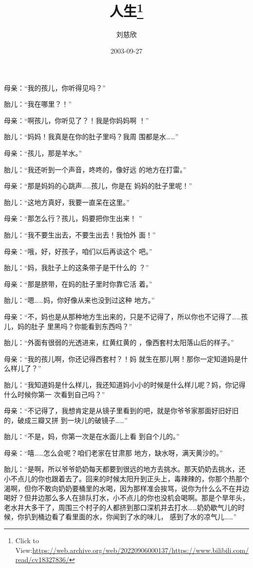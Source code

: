 \documentclass{article}
\title{人生\footnote{Click to View:\url{https://web.archive.org/web/20220906000137/https://www.bilibili.com/read/cv18327836/}}}
\author{刘慈欣}
\date{2003-09-27}
\begin{document}

\maketitle


\Large


﻿母亲：“我的孩儿，你听得见吗？” 


胎儿：“我在哪里？！” 

母亲：“啊孩儿，你听见了？！我是你妈妈啊
！” 

胎儿：“妈妈！我真是在你的肚子里吗？我周
围都是水……” 


母亲：“孩儿，那是羊水。” 

胎儿：“我还听到一个声音，咚咚的，像好远
的地方在打雷。” 

\newpage

母亲：“那是妈妈的心跳声……孩儿，你是在
妈妈的肚子里呢！” 

胎儿：“这地方真好，我要一直呆在这里。”
 

母亲：“那怎么行？孩儿，妈要把你生出来！
” 

胎儿：“我不要生出去，不要生出去！我怕外
面！” 

母亲：“哦，好，好孩子，咱们以后再谈这个
吧。” 

胎儿：“妈，我肚子上的这条带子是干什么的
？” 

母亲：“那是脐带，在妈的肚子里时你靠它活
着。” 

\newpage

胎儿：“嗯……妈，你好像从来也没到过这种
地方。” 

母亲：“不，妈也是从那种地方生出来的，只是不记得了，所以你也不记得了……孩儿，妈的肚子
里黑吗？你能看到东西吗？” 

胎儿：“外面有很弱的光透进来，红黄红黄的
，像西套村太阳落山后的样子。” 

母亲：“我的孩儿啊，你还记得西套村？！妈
就生在那儿啊！那你一定知道妈是什么样儿了？” 

胎儿：“我知道妈是什么样儿，我还知道妈小小的时候是什么样儿呢？妈，你记得什么时候你第一
次看到自己吗？” 

母亲：“不记得了，我想肯定是从镜子里看到的吧，就是你爷爷家那面好旧好旧的，破成三瓣又拼
到一块儿的破镜子……” 

\newpage

胎儿：“不是，妈，你第一次是在水面儿上看
到自个儿的。” 

母亲：“嘻……怎么会呢？咱们老家在甘肃那
地方，缺水呀，满天黄沙的。” 

胎儿：“是啊，所以爷爷奶奶每天都要到很远的地方去挑水。那天奶奶去挑水，还小不点儿的你也跟着去了。回来的时候太阳升到正头上，毒辣辣的，你那个热那个渴啊，但你不敢向奶奶要桶里的水喝，因为那样准会挨骂，说你为什么么不在井边喝好？但井边那么多人在排队打水，小不点儿的你也没机会喝啊。那是个旱年头，老水井大多干了，周围三个村子的人都挤到那口深机井去打水……奶奶歇气儿的时候，你扒到桶边看了看里面的水，你闻到了水的味儿，
感到了水的凉气儿……” 
\end{document}

